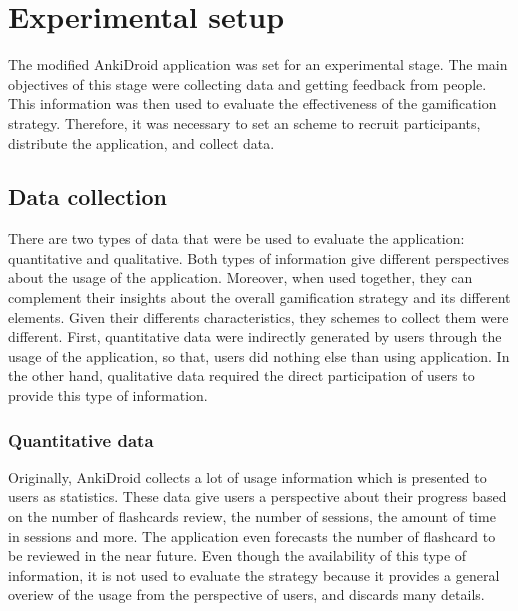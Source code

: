 
\chapter{Experimental setup} %

\label{expe} %


The modified AnkiDroid application was set for an experimental stage. The main objectives of this stage were collecting data and getting feedback from people. This information was then used to evaluate the effectiveness of the gamification strategy. Therefore, it was necessary to set an scheme to recruit participants, distribute the application, and collect data.

\section{Data collection}
There are two types of data that were be used to evaluate the application: quantitative and qualitative. Both types of information give different perspectives about the usage of the application. Moreover, when used together, they can complement their insights about the overall gamification strategy and its different elements. Given their differents characteristics, they schemes to collect them were different. First, quantitative data were indirectly generated by users through the usage of the application, so that, users did nothing else than using application. In the other hand, qualitative data required the direct participation of users to provide this type of information.

\subsection{Quantitative data}
Originally, AnkiDroid collects a lot of usage information which is presented to users as statistics. These data give users a perspective about their progress based on the number of flashcards review, the number of sessions, the amount of time in sessions and more. The application even forecasts the number of flashcard to be reviewed in the near future. Even though the availability of this type of information, it is not used to evaluate the strategy because it provides a general overiew of the usage from the perspective of users, and discards many details.

